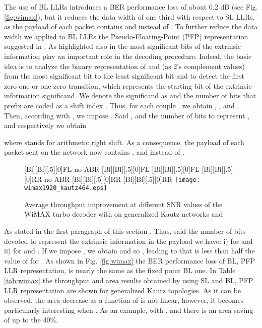 \documentclass[10pt,twocolumn,journal]{IEEEtran}
\begin{document}
The use of BL LLRs introduces a BER performance loss of about 0.2 dB (see Fig. \ref{fig:wimax}), 
but it reduces the data width of one third with respect to SL LLRs,
as the payload of each packet contains  and  
instead of . 
To further reduce the data width we applied to BL LLRs the Pseudo-Floating-Point (PFP) representation suggested 
in \cite{lee_VTC08}.
As highlighted also in \cite{vogt_EL00,masera_ISTC08} the most significant bits of the extrinsic information 
play an important role in the decoding procedure. 
Indeed, the basic idea is to analyze the binary representation of  and  
(as 2's complement values) from the most significant bit to the least significant bit and to detect the first 
zero-one or one-zero transition, which represents the starting bit of the extrinsic information significand. 
We denote the significand as  and the number of bits that prefix  are coded as a shift index . 
Thus, for each couple ,  we obtain , , 
 and . 
Then, according with \cite{lee_VTC08}, we impose . 
Said ,  and  the number of bits to represent ,  and  
respectively we obtain 

where  stands for arithmetic right shift. As a consequence, the payload of each packet sent on the network 
now contains ,  and  instead of .
\begin{figure}[h!]
    \centering
      [Bl][Bl][.5][0]{FL no ABR}
      [Bl][Bl][.5][0]{FL }
      [Bl][Bl][.5][0]{FL }
      [Bl][Bl][.5][0]{RR no ABR}
      [Bl][Bl][.5][0]{RR }
      [Bl][Bl][.5][0]{RR }
      \texttt{[image: wimax1920\_kautz464.eps]}
\caption{Average throughput improvement at different SNR values of the WiMAX  turbo decoder with  
on generalized Kautz networks  and }
\label{fig:ABR_wimax_1920_4}
\end{figure}

As stated in the first paragraph of this section . Thus, said  the number of bits 
devoted to represent the extrinsic information in the payload we have: i)  for  and
ii)  for  and .
If we impose , we obtain  and so , leading to  that is less 
than half the value of  for . As shown in Fig. \ref{fig:wimax} the BER performance loss 
of BL, PFP LLR representation, is nearly the same as the fixed point BL one.
In Table \ref{tab:wimax} the throughput and area results obtained by using SL and BL, PFP LLR 
representation are shown for generalized Kautz topologies. 
As it can be observed, the area decrease as a function of  is not linear, however, 
it becomes particularly interesting when . As an example, with ,  and  there is an area saving of up to the 40\%.
\end{document}
